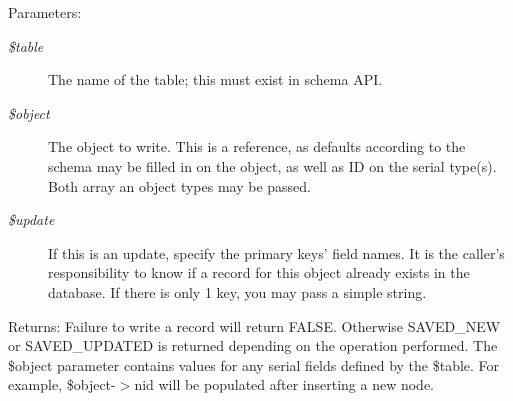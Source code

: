 \begin{Desc}
\item[Parameters:]
\begin{description}
\item[{\em \$table}]The name of the table; this must exist in schema API. \item[{\em \$object}]The object to write. This is a reference, as defaults according to the schema may be filled in on the object, as well as ID on the serial type(s). Both array an object types may be passed. \item[{\em \$update}]If this is an update, specify the primary keys' field names. It is the caller's responsibility to know if a record for this object already exists in the database. If there is only 1 key, you may pass a simple string. \end{description}
\end{Desc}
\begin{Desc}
\item[Returns:]Failure to write a record will return FALSE. Otherwise SAVED\_\-NEW or SAVED\_\-UPDATED is returned depending on the operation performed. The \$object parameter contains values for any serial fields defined by the \$table. For example, \$object-$>$nid will be populated after inserting a new node. \end{Desc}
